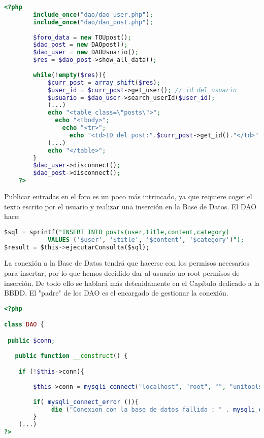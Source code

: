 \documentclass[12pt]{report}
\begin{document}
\begin{lstlisting}[language=PHP]
<?php   
        include_once("dao/dao_user.php");
        include_once("dao/dao_post.php");
     
        $foro_data = new TOUpost();
        $dao_post = new DAOpost();
        $dao_user = new DAOUsuario();
        $res = $dao_post->show_all_data();
        
        while(!empty($res)){
            $curr_post = array_shift($res);
            $user_id = $curr_post->get_user(); // id del usuario 
            $usuario = $dao_user->search_userId($user_id);
            (...)
            echo "<table class=\"posts\">";
	          echo "<tbody>";
		        echo "<tr>";
			      echo "<td>ID del post:".$curr_post->get_id()."</td>";
            (...)
            echo "</table>";       
        } 
        $dao_user->disconnect();
        $dao_post->disconnect();
    ?>
\end{lstlisting}

Publicar entradas en el foro es un poco más intrincado, ya que requiere coger el texto escrito por el usuario y realizar una inserción en la Base de Datos. El DAO hace:
\newline

\begin{lstlisting}[language=SQL]
$sql = sprintf("INSERT INTO posts(user,title,content,category) 
		    VALUES ('$user', '$title', '$content', '$category')");
$result = $this->ejecutarConsulta($sql);
\end{lstlisting}
La conexión a la Base de Datos tendrá que hacerse con los permisos necesarios para insertar, por lo que hemos decidido dar al usuario no root permisos de inserción. De todo ello se hablará más detenidamente en el Capítulo dedicado a la BBDD. El "padre" de los DAO es el encargado de gestionar la conexión.
\newline
\begin{lstlisting}[language=PHP]
<?php

class DAO {

 public $conn;
	
   public function __construct() {

	if (!$this->conn){
		
		$this->conn = mysqli_connect("localhost", "root", "", "unitoolsdb");
		
		if( mysqli_connect_error ()){
			 die ("Conexion con la base de datos fallida : " . mysqli_connect_error());
		}	 
    (...)
?>
\end{lstlisting}
\end{document}
